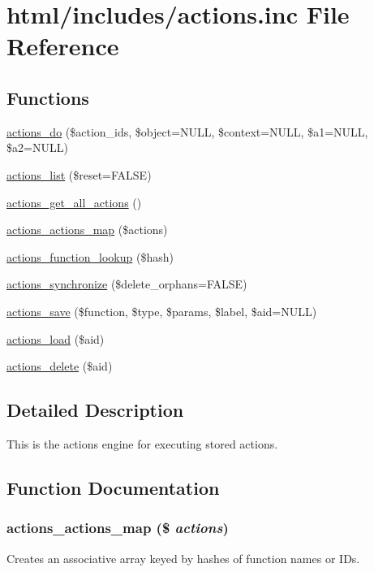 \hypertarget{actions_8inc}{
\section{html/includes/actions.inc File Reference}
\label{actions_8inc}
}
\subsection*{Functions}
\begin{DoxyCompactItemize}
\item 
\hyperlink{group__actions_gacfece93b3453da7c572057dde3453122}{actions\_\-do} (\$action\_\-ids, \$object=NULL, \$context=NULL, \$a1=NULL, \$a2=NULL)
\item 
\hyperlink{actions_8inc_ad0dbf276d4ca1834760cffc7e1b1be53}{actions\_\-list} (\$reset=FALSE)
\item 
\hyperlink{actions_8inc_a4275e9fee609ba6e85b03278a681436c}{actions\_\-get\_\-all\_\-actions} ()
\item 
\hyperlink{actions_8inc_ad943b3f497c80809d895ecc01490d10f}{actions\_\-actions\_\-map} (\$actions)
\item 
\hyperlink{actions_8inc_a4a0e35c01b48d1a413889948c061a6f0}{actions\_\-function\_\-lookup} (\$hash)
\item 
\hyperlink{actions_8inc_a139190d8981f8e48be78b24d2adaab1c}{actions\_\-synchronize} (\$delete\_\-orphans=FALSE)
\item 
\hyperlink{actions_8inc_ad57cade4c548a0d8fe2e6902d7292ad8}{actions\_\-save} (\$function, \$type, \$params, \$label, \$aid=NULL)
\item 
\hyperlink{actions_8inc_a1e953639945d342b20fe51b8d21095cc}{actions\_\-load} (\$aid)
\item 
\hyperlink{actions_8inc_a857468911c3dd6f839cbdb14c6ed80ac}{actions\_\-delete} (\$aid)
\end{DoxyCompactItemize}


\subsection{Detailed Description}
This is the actions engine for executing stored actions. 

\subsection{Function Documentation}
\hypertarget{actions_8inc_ad943b3f497c80809d895ecc01490d10f}{
\subsubsection[{actions\_\-actions\_\-map}]{\setlength{\rightskip}{0pt plus 5cm}actions\_\-actions\_\-map (\$ {\em actions})}}
\label{actions_8inc_ad943b3f497c80809d895ecc01490d10f}
Creates an associative array keyed by hashes of function names or IDs.


